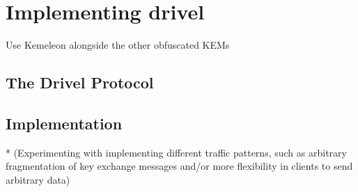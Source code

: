 \chapter{Implementing drivel}\label{ch:implementation}

Use Kemeleon alongside the other obfuscated KEMs

\section{The Drivel Protocol} \label{sec:drivel}

\section{Implementation} \label{sec:implementation}

* (Experimenting with implementing different traffic patterns, such as arbitrary fragmentation of key
exchange messages and/or more flexibility in clients to send arbitrary data)
